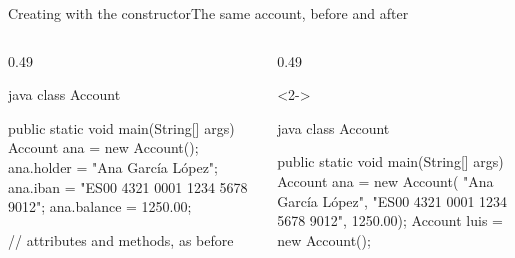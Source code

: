 \documentclass[\deckoptions]{beamer}
\begin{document}
\begin{frame}[fragile]{Creating with the constructor}{The same account, before and after}
  \begin{columns}[T, onlytextwidth]
    \begin{column}{0.49\textwidth}
\begin{codeblock}[steps={||3-6|3,9|none|}, diff, dense, marks={3-6/3, 3+9/4}]{java}
class Account {
    public static void main(String[] args) {
        Account ana = new Account();
        ana.holder = "Ana García López";
        ana.iban = "ES00 4321 0001 1234 5678 9012";
        ana.balance = 1250.00;
    }

    // attributes and methods, as before
}
\end{codeblock}
    \end{column}
    \begin{column}{0.49\textwidth}
      \begin{uncoverenv}<2->
\begin{codeblock}[steps={||3-6|none|7,10|}, diff, dense, marks={3-6/3, 7+10/5/error/3}, add={7/5}, strike={7/5}]{java}
class Account {
    public static void main(String[] args) {
        Account ana = new Account(
                "Ana García López",
                "ES00 4321 0001 1234 5678 9012",
                1250.00);
        Account luis = new Account();
    }

}
\end{codeblock}
\end{uncoverenv}
\end{column}
\end{columns}
\end{frame}
\end{document}
